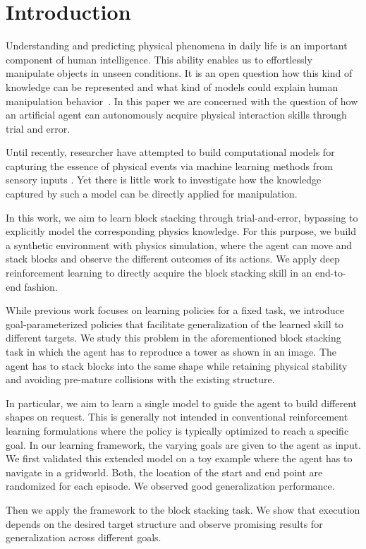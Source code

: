 \section{Introduction}
Understanding and predicting physical phenomena in daily life is an important component of human intelligence. This ability enables us to effortlessly manipulate objects in unseen conditions. It is an open question how this kind of knowledge can be represented and what kind of models could explain human manipulation behavior~\citep{yildirim2017physical}. In this paper we are concerned with the question of how an artificial agent can autonomously acquire physical interaction skills through trial and error. 

Until recently, researcher have attempted to build computational models for capturing the essence of physical events via machine learning methods from sensory inputs \citep{mottaghi2015newtonian,wu2015galileo,fragkiadaki2015learning,apratim16ariv,fergus16blocsarxiv,li2016fall}. Yet there is little work to investigate how the knowledge captured by such a model can be directly applied for manipulation.

In this work, we aim to learn block stacking through trial-and-error, bypassing to explicitly model the corresponding physics knowledge. For this purpose, we build a synthetic environment with physics simulation, where the agent can move and stack blocks and observe the different outcomes of its actions. We apply deep reinforcement learning to directly acquire the block stacking skill in an end-to-end fashion.

While previous work focuses on learning policies for a fixed task, we introduce goal-parameterized policies that facilitate generalization of the learned skill to different targets.
We study this problem in the aforementioned block stacking task in which the agent has to reproduce a tower as shown in an image. The agent has to stack blocks into the same shape while retaining physical stability and avoiding pre-mature collisions with the existing structure.

In particular, we aim to learn a single model to guide the agent to build different shapes on request. This is generally not intended in conventional reinforcement learning formulations where the policy is typically optimized to reach a specific goal. In our learning framework, the varying goals are given to the agent as input. We first validated this extended model on a toy example where the agent has to navigate in a gridworld. Both, the location of the start and end point are randomized for each episode. We observed good generalization performance. 

Then we apply the framework to the block stacking task. We show that execution depends on the desired target structure and observe promising results for generalization across different goals.